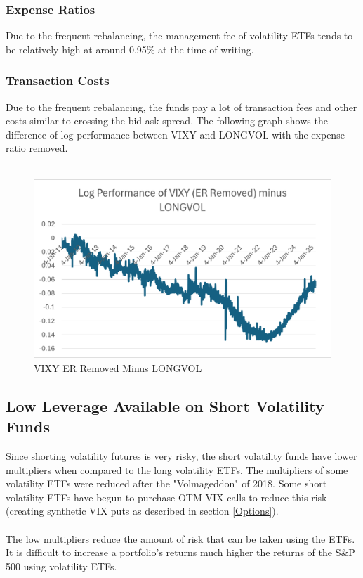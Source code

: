\documentclass[11pt, oneside]{book}
\begin{document}
\subsubsection{Expense Ratios} \label{ETFs-Benefits-Costs-ER}
Due to the frequent rebalancing, the management fee of volatility ETFs tends to be relatively high at around 0.95\% at the time of writing.

\subsubsection{Transaction Costs} \label{ETFs-Drawbacks-Costs-Transaction}
Due to the frequent rebalancing, the funds pay a lot of transaction fees and other costs similar to crossing the bid-ask spread. The following graph shows the difference of log performance between VIXY and LONGVOL with the expense ratio removed.\\
\\
\begin{figure}[H]
\centering
\includegraphics[width=\textwidth]{VIXYERRemovedMinusLONGVOL.png}
\caption{VIXY ER Removed Minus LONGVOL} \label{Fig-VIXYERRemVersusLONGVOL}
\end{figure}
\noindent

\subsection{Low Leverage Available on Short Volatility Funds} \label{ETFs-Drawbacks-Leverage}
Since shorting volatility futures is very risky, the short volatility funds have lower multipliers when compared to the long volatility ETFs. The multipliers of some volatility ETFs were reduced after the "Volmageddon" of 2018. Some short volatility ETFs have begun to purchase OTM VIX calls to reduce this risk (creating synthetic VIX puts as described in section \ref{Options}).\\
\\
The low multipliers reduce the amount of risk that can be taken using the ETFs. It is difficult to increase a portfolio's returns much higher the returns of the S\&P 500 using volatility ETFs.
\end{document}
